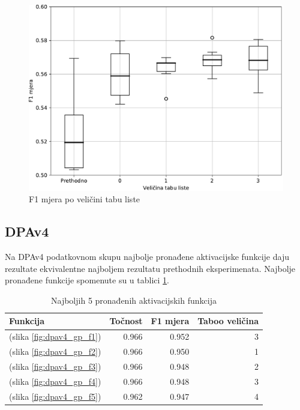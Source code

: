 \documentclass[times, utf8, numeric, diplomski]{fer}
\def\figref#1{(slika \ref{#1})}
\def\TODO#1{\noindent\textcolor{red}{TODO: \textit{#1}}\newline}
\def\todo#1{\TODO{#1}}
\begin{document}
\begin{figure}[H]
\includegraphics[width=.9\textwidth]{GP_256class_f1_plus.pdf}
\centering
\caption{F1 mjera po veličini tabu liste}
\label{fig:gp_256_f1}
\end{figure}

%

\subsection{DPAv4}
Na DPAv4 podatkovnom skupu najbolje pronađene aktivacijske funkcije daju rezultate ekvivalentne najboljem rezultatu prethodnih eksperimenata. Najbolje pronađene funkcije spomenute su u tablici \ref{tab:dpav4_top5}.

\begin{table}[H]
\begin{tabular}{lrrr}
Funkcija & Točnost & F1 mjera & Taboo veličina \\
\hline
\figref{fig:dpav4_gp_f1} & 0.966 & 0.952 & 3 \\
\figref{fig:dpav4_gp_f2} & 0.966 & 0.950 & 1 \\
\figref{fig:dpav4_gp_f3} & 0.966 & 0.948 & 2 \\
\figref{fig:dpav4_gp_f4} & 0.966 & 0.948 & 3 \\
\figref{fig:dpav4_gp_f5} & 0.962 & 0.947 & 4 \\
\end{tabular}
\centering
\caption{Najboljih 5 pronađenih aktivacijskih funkcija}
\label{tab:dpav4_top5}
\end{table}
\end{document}
